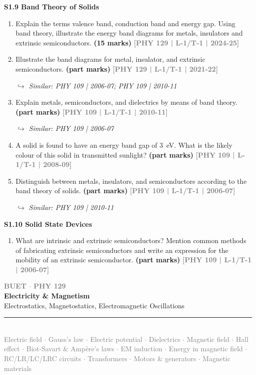 \documentclass[12pt,a3paper]{article}
\newcommand{\yr}[1]{\hfill\textcolor{gray}{\small\textbf{[#1]}}}
\newcommand{\mk}[1]{\textcolor{orange!70!black}{\small\textbf{(#1 marks)}}}
\newcommand{\variant}[1]{\par\vspace{1pt}\textcolor{blue!50!black}%
  {\footnotesize\textit{$\hookrightarrow$ Similar: #1}}}
\newcommand{\secdivider}[6]{%
  \newpage\thispagestyle{empty}%
  \vspace*{\fill}%
  \begin{tcolorbox}[enhanced,colback=#6!7,colframe=#5,boxrule=1.5pt,arc=8pt,
    left=20pt,right=20pt,top=22pt,bottom=22pt,
    shadow={3pt}{-3pt}{0pt}{black!15}]
    \centering
    {\large\textcolor{gray}{\textbf{BUET $\cdot$ PHY 129}}}\\[8pt]
    {\fontsize{22}{28}\selectfont\bfseries\textcolor{#5}{#2}}\\[6pt]
    {\fontsize{13}{17}\selectfont\textcolor{dgray}{#3}}\\[10pt]
    \textcolor{#5!60}{\rule{0.5\textwidth}{0.5pt}}\\[6pt]
    {\small\textcolor{gray}{#4}}
  \end{tcolorbox}%
  \vspace*{\fill}\newpage%
}
\newcommand{\subtopic}[2]{%
  \vspace{10pt}
  \noindent\begin{tcolorbox}[colback=#1!8,colframe=#1,boxrule=0.6pt,arc=4pt,
    left=6pt,right=6pt,top=4pt,bottom=4pt]
    \small\bfseries\textcolor{#1}{#2}
  \end{tcolorbox}
  \vspace{2pt}
}
\begin{document}
\label{sec:s19}
\subtopic{cA}{S1.9 \quad Band Theory of Solids}

\begin{enumerate}

\item Explain the terms valence band, conduction band and energy gap. Using band
theory, illustrate the energy band diagrams for metals, insulators and extrinsic
semiconductors.  \mk{15} \yr{PHY 129 | L-1/T-1 | 2024-25}


\item Illustrate the band diagrams for metal, insulator, and extrinsic semiconductors.
\mk{part} \yr{PHY 129 | L-1/T-1 | 2021-22}
\variant{PHY 109 | 2006-07; PHY 109 | 2010-11}

\item Explain metals, semiconductors, and dielectrics by means of band theory.
\mk{part} \yr{PHY 109 | L-1/T-1 | 2010-11}
\variant{PHY 109 | 2006-07}

\item A solid is found to have an energy band gap of $3$~eV. What is the likely colour of this solid in transmitted sunlight?
\mk{part} \yr{PHY 109 | L-1/T-1 | 2008-09}

\item Distinguish between metals, insulators, and semiconductors according to the band theory of solids.
\mk{part} \yr{PHY 109 | L-1/T-1 | 2006-07}
\variant{PHY 109 | 2010-11}

\end{enumerate}

\label{sec:s110}
\subtopic{cA}{S1.10 \quad Solid State Devices}

\begin{enumerate}

\item What are intrinsic and extrinsic semiconductors? Mention common methods of fabricating extrinsic semiconductors and write an expression for the mobility of an extrinsic semiconductor.
\mk{part} \yr{PHY 109 | L-1/T-1 | 2006-07}

\end{enumerate}


\secdivider{Part II}{Electricity \& Magnetism}%
  {Electrostatics, Magnetostatics, Electromagnetic Oscillations}%
  {Electric field $\cdot$ Gauss's law $\cdot$ Electric potential $\cdot$ Dielectrics $\cdot$ Magnetic field $\cdot$ Hall effect $\cdot$ Biot-Savart \& Amp\`ere's laws $\cdot$ EM induction $\cdot$ Energy in magnetic field $\cdot$ RC/LR/LC/LRC circuits $\cdot$ Transformers $\cdot$ Motors \& generators $\cdot$ Magnetic materials}%
  {cB}{blue}
\end{document}
